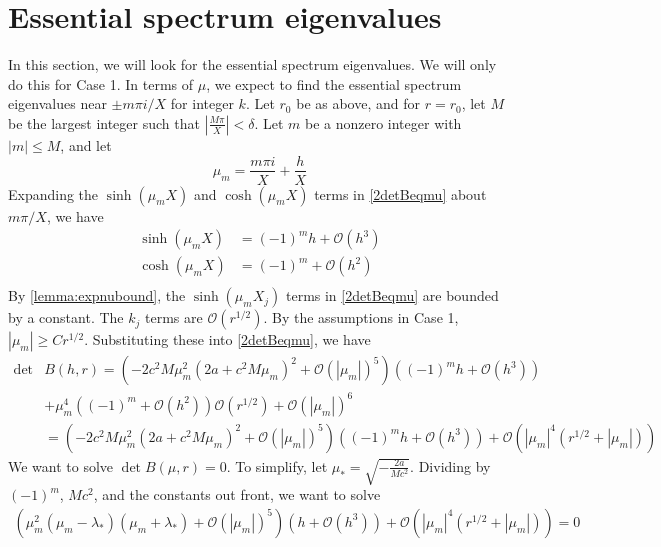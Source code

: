 \documentclass[thesis.tex]{subfiles}
\begin{document}
\section{Essential spectrum eigenvalues}

In this section, we will look for the essential spectrum eigenvalues. We will only do this for Case 1. In terms of $\mu$, we expect to find the essential spectrum eigenvalues near $\pm m \pi i/X$ for integer $k$. Let $r_0$ be as above, and for $r = r_0$, let $M$ be the largest integer such that $\left| \frac{M \pi}{X} \right| < \delta$. Let $m$ be a nonzero integer with $|m| \leq M$, and let
\[
\mu_m = \frac{m \pi i}{X} + \frac{h}{X}
\]
Expanding the $\sinh(\mu_m X)$ and $\cosh(\mu_m X)$ terms in \cref{2detBeqmu} about $m \pi/X$, we have
\begin{align*}
\sinh(\mu_m X) &= (-1)^m h + \mathcal{O}(h^3) \\
\cosh(\mu_m X) &= (-1)^m + \mathcal{O}(h^2) \\
\end{align*}
By \cref{lemma:expnubound}, the $\sinh(\mu_m X_j)$ terms in \cref{2detBeqmu} are bounded by a constant. The $k_j$ terms are $\mathcal{O}(r^{1/2})$. By the assumptions in Case 1, $|\mu_m| \geq C r^{1/2}$. Substituting these into \cref{2detBeqmu}, we have 
\begin{equation}\label{Bess1}
\begin{aligned}
\det &B(h, r) = \left(-2 c^2 M  \mu_m^2 \left( 2a + c^2 M \mu_m \right)^2 + \mathcal{O}( |\mu_m|)^5 \right) \left( (-1)^m h + \mathcal{O}(h^3) \right) \\
&+ \mu_m^4 \left( (-1)^m + \mathcal{O}(h^2)\right)\mathcal{O}(r^{1/2}) + \mathcal{O}\left( |\mu_m| \right)^6 \\
&= \left(-2 c^2 M  \mu_m^2 \left( 2a + c^2 M \mu_m \right)^2 + \mathcal{O}( |\mu_m|)^5 \right) \left( (-1)^m h + \mathcal{O}(h^3) \right) + \mathcal{O}\left( |\mu_m|^4(r^{1/2} + |\mu_m|) \right)
\end{aligned}
\end{equation}
We want to solve $\det B(\mu, r) = 0$. To simplify, let $\mu_* = \sqrt{-\frac{2a}{M c^2}}$. Dividing by $(-1)^m$, $M c^2$, and the constants out front, we want to solve 
\begin{equation}\label{Bess2}
\begin{aligned}
\left(\mu_m^2 (\mu_m - \lambda_*)(\mu_m + \lambda_*) + \mathcal{O}( |\mu_m|)^5 \right) \left( h + \mathcal{O}(h^3) \right) + \mathcal{O}\left( |\mu_m|^4(r^{1/2} + |\mu_m|) \right) = 0
\end{aligned}
\end{equation}
\end{document}
